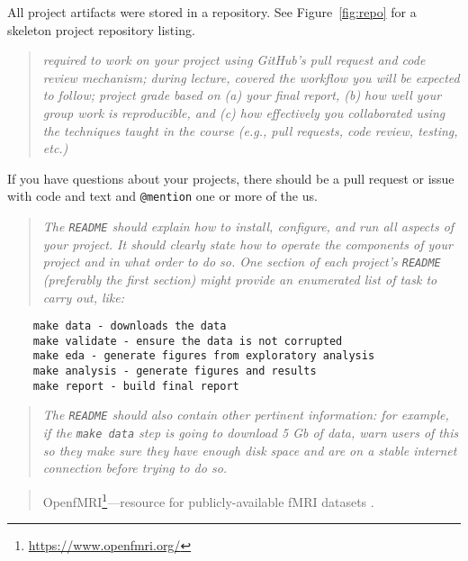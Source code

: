 All project artifacts were stored in a repository.
See Figure~\ref{fig:repo} for a skeleton project repository listing.

\begin{quote}\emph{
required to work on your project using GitHub's pull request and code review mechanism;
during lecture, covered the workflow you will be expected to follow;
project grade based on (a) your final report, (b) how well your group work is
reproducible, and (c) how effectively you collaborated using the techniques
taught in the course (e.g., pull requests, code review, testing, etc.)
}\end{quote}


If you have questions about your projects, there should be a pull request
or issue with code and text and \texttt{@mention} one or more of the us.


\begin{quote}\emph{
The \texttt{README} should explain how to install, configure,
and run all aspects of your project.
It should clearly state how to operate the
components of your project and in what order to do so.
One section of each project's \texttt{README} (preferably the first section)
might provide an enumerated list of task to carry out, like:
}\end{quote}

\begin{verbatim}
    make data - downloads the data 
    make validate - ensure the data is not corrupted
    make eda - generate figures from exploratory analysis
    make analysis - generate figures and results
    make report - build final report
\end{verbatim}

\begin{quote}\emph{
The \texttt{README} should also contain other pertinent information: for example, if
the \texttt{make data} step is going to download 5 Gb of data,
warn users of this so they make sure they have enough disk space and are on a
stable internet connection before trying to do so.
}\end{quote}


 

\begin{quote}
OpenfMRI\footnote{\url{https://www.openfmri.org/}}---resource for publicly-available fMRI datasets
\citep{poldrack2013toward,poldrack2015openfmri}.
\end{quote}

